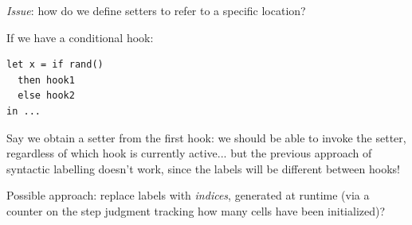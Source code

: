 \documentclass{article}
\newcommand{\mf}[1]{\mathsf{#1}}
\newcommand{\mc}[1]{\mathcal{#1}}
\newcommand{\mb}[1]{\mathbf{#1}}
\newcommand{\hl}[1]{\colorbox{LightGoldenrod1}{#1}}
\newcommand{\arrow}[1]{\xrightarrow{#1}}
\newcommand{\tone}{\mb{1}}
\newcommand{\tstr}{\mf{String}}
\newcommand{\tview}{\mf{View}}
\newcommand{\tattr}{\mf{Attr}}
\newcommand{\bang}{\ !\ }
\newcommand{\vtxt}[1]{\mf{text}\ #1}
\newcommand{\vtag}[2]{\mf{tag}(#1, #2)}
\newcommand{\vattr}[2]{\mf{attr}(#1, #2)}
\newcommand{\vclick}[1]{\mf{onClick}\ #1}
\newcommand{\Ell}{\mc{L}}
\newcommand{\elet}[3]{\mf{let}\ #1 = #2\ \mf{in}\ #3}
\begin{document}


\emph{Issue}: how do we define setters
to refer to a specific location?

If we have a conditional hook:
\begin{lstlisting}[mathescape]
let x = if rand()
  then hook1
  else hook2
in ...
\end{lstlisting}
Say we obtain a setter from the first hook:
we should be able to invoke the setter,
regardless of which hook is currently active...
but the previous approach of syntactic labelling doesn't work,
since the labels will be different between hooks!

Possible approach: replace labels with \emph{indices},
generated at runtime (via a counter on the step judgment
tracking how many cells have been initialized)?
\end{document}
